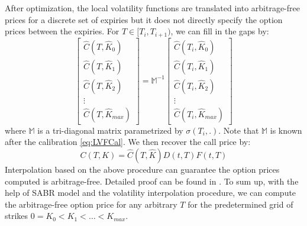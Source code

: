 \documentclass[letterpaper,12pt,titlepage,oneside,final]{book}
\numberwithin{equation}{section}
\theoremstyle{definition}
\begin{document}
	After optimization,  the local volatility functions are translated into arbitrage-free prices for a discrete set of expiries but it does not directly specify the option prices between the expiries.  For $T \in [T_i,T_{i+1})$, we can fill in the gaps by:
	\[
	\begin{bmatrix}
	\widehat{C}(T,\widehat{K}_0)\\
	\widehat{C}(T,\widehat{K}_1)\\
	\widehat{C}(T,\widehat{K}_2)\\
	\vdots\\
	\widehat{C}(T,\widehat{K}_{max})
	\end{bmatrix}=\mathcal{\mathbb{M}}^{-1} \begin{bmatrix}
		\widehat{C}(T_{i},\widehat{K}_0)\\
		\widehat{C}(T_{i},\widehat{K}_1)\\
		\widehat{C}(T_{i},\widehat{K}_2)\\
		\vdots\\
		\widehat{C}(T_{i},\widehat{K}_{max})
		\end{bmatrix}
		\]
where $\mathcal{\mathbb{M}}$ is a tri-diagonal matrix parametrized by  $\sigma(T_i,.)$. Note that $\mathcal{\mathbb{M}}$ is known after the calibration \eqref{eq:LVFCal}.
We then recover the call price by:
\[
C(T,K)=\widehat{C}(T,\widehat{K}){D(t,T)F(t,T)}
\]
Interpolation based on the above procedure can guarantee the option prices computed is arbitrage-free. Detailed proof can be found in \cite{andreasen2010volatility}. To sum up, with the help of SABR model and the volatility interpolation procedure, we can compute the arbitrage-free option price for any arbitrary $T$ for the predetermined grid of strikes $0=K_0<K_1<\dots<K_{max}$. 
\end{document}
